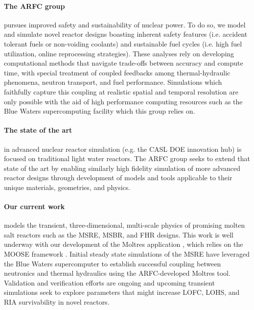 \documentclass[11pt]{article}
\newcommand{\authorname}{Kathryn~D.~Huff }
\newcommand{\authorsite}{arfc.npre.illinois.edu}
\begin{document}
\pagestyle{fancy}
\lhead{\textcolor{gray}{Investigator: Prof. \authorname}}
\rhead{\textcolor{gray}{Advanced Reactors and Fuel Cycles}}
\renewcommand{\headrulewidth}{0pt}
\renewcommand{\footrulewidth}{0pt}
\fancyfoot[C]{\footnotesize \textcolor{gray}{\authorsite}}

\paragraph{The \gls{ARFC} group} pursues improved 
safety and sustainability of nuclear power. To do so, we model and simulate novel reactor designs
boasting inherent safety features (i.e. accident tolerant fuels or non-voiding 
coolants) and sustainable fuel cycles (i.e. high fuel utilization, online 
reprocessing strategies). These analyses rely on developing computational 
methods that navigate trade-offs between accuracy and compute time, with 
special treatment of coupled feedbacks among thermal-hydraulic phenomena, 
neutron transport, and fuel performance.
Simulations which faithfully capture this coupling at realistic spatial and
temporal resolution are only possible with the aid of high performance
computing resources such as the Blue Waters supercomputing facility which this 
group relies on.

\paragraph{The state of the art} in advanced nuclear reactor simulation (e.g. the 
CASL DOE innovation hub) is focused on traditional light water reactors.  The 
\gls{ARFC} group seeks to extend that state of the art by enabling similarly high 
fidelity simulation of more advanced reactor designs through development of 
models and tools applicable to their unique materials, geometries, and physics. 


\paragraph{Our current work} models the transient, three-dimensional, multi-scale physics
of promising molten salt reactors such as the \gls{MSRE}, \gls{MSBR}, and \gls{FHR} designs.  
This work is well underway with our development of the Moltres application 
\cite{lindsay_moltres_2017}, which relies on the \gls{MOOSE} framework \cite{gaston_moose:_2009}. 
Initial steady state simulations of the \gls{MSRE} have leveraged the Blue Waters 
supercomputer to establish successful coupling between neutronics and thermal 
hydraulics using the \gls{ARFC}-developed Moltres tool. Validation and 
verification efforts are ongoing and upcoming transient simulations seek to explore 
parameters that might increase \gls{LOFC}, \gls{LOHS}, and \gls{RIA} 
survivability in novel reactors.
\end{document}
